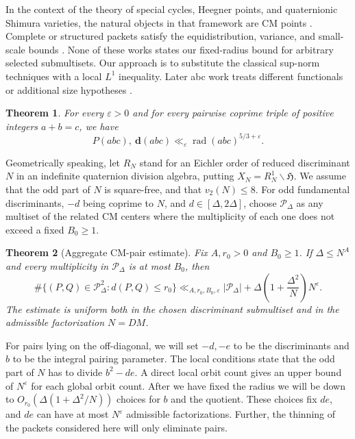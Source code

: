 \documentclass[11pt,reqno]{amsart}
\newtheorem{theorem}{Theorem}[section]
\theoremstyle{definition}
\newcommand{\Hh}{\mathfrak H}
\newcommand{\rad}{\operatorname{rad}}
\newcommand{\dd}{\mathbf d}
\newcommand{\eps}{\varepsilon}
\begin{document}
In the context of the theory of special cycles, Heegner points, and
quaternionic Shimura varieties, the natural objects in that framework are CM
points
\cite{KudlaRapoportYang,ZhangCMEquidistribution,ZhangHeegner,YuanZhangColmez}. 
Complete or structured packets satisfy the equidistribution, variance, and
small-scale bounds
\cite{MichelHeegner,HarcosMichel,Khayutin,LiuMasriYoung,AlsinaChatzakos, HumphriesRadziwill,WieserYang}. None of these works states our fixed-radius bound for arbitrary selected
submultisets. 
Our approach is to substitute the classical sup-norm techniques
\cite{BlomerHolowinsky,DasSengupta} with a local $L^1$ inequality. Later abc work treats different functionals or additional size hypotheses
\cite{PastenSepulveda}.

\begin{theorem}\label{thm:main}
For every $\eps>0$ and for every pairwise coprime triple of positive integers
$a+b=c$, we have
\[
 P(abc),\ \dd(abc)\ll_\eps \rad(abc)^{5/3+\eps}.
\]
\end{theorem}

Geometrically speaking, let $R_N$ stand for an Eichler order of reduced
discriminant $N$ in an indefinite quaternion division algebra, putting
$X_N=R_N^1\backslash\Hh$. We assume that the odd part of $N$ is square-free, and that $v_2(N)\leq8$. For odd fundamental discriminants, $-d$ being coprime to $N$, and
$d\in[\Delta,2\Delta]$, choose $\mathscr P_\Delta$ as any multiset of the
related CM centers where the multiplicity of each one does not exceed a
fixed $B_0\geq1$.

\begin{theorem}[Aggregate CM-pair estimate]\label{thm:pair-intro}
Fix $A,r_0>0$ and $B_0\geq1$.  If $\Delta\leq N^A$ and every multiplicity
in $\mathscr P_\Delta$ is at most $B_0$, then
\[
 \#\{(P,Q)\in\mathscr P_\Delta^2:d(P,Q)\leq r_0\}
 \ll_{A,r_0,B_0,\eps}
 |\mathscr P_\Delta|+
 \Delta\left(1+\frac{\Delta^2}{N}\right)N^\eps.
\] The estimate is uniform both in the chosen discriminant submultiset and
in the admissible factorization $N=DM$.
\end{theorem}

For pairs lying on the off-diagonal, we will set $-d,-e$ to be the discriminants and $b$ to be the integral pairing parameter. The local conditions state that the odd part of $N$ has to divide $b^2-de$. A direct local orbit count gives an upper bound of $N^\eps$ for each global orbit count. After we have fixed the radius we will be down to $O_{r_0}(\Delta(1+\Delta^2/N))$ choices for $b$ and the quotient. These choices fix $de$, and $de$ can have at most $N^\eps$ admissible factorizations. Further, the thinning of the packets considered here will only eliminate pairs.
\end{document}
